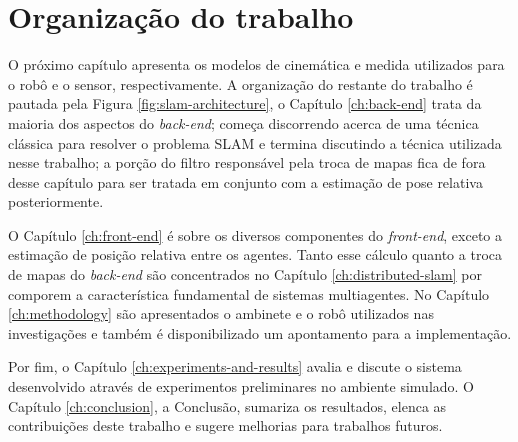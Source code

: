 \section{Organização do trabalho}
O próximo capítulo apresenta os 
modelos de cinemática e medida utilizados para o robô e o sensor, respectivamente. A organização do restante do 
trabalho é pautada pela Figura \ref{fig:slam-architecture}, o Capítulo 
\ref{ch:back-end} trata da maioria dos aspectos do \textit{back-end}; começa discorrendo acerca de uma técnica clássica para resolver o problema SLAM e termina discutindo a técnica utilizada nesse trabalho; a porção do filtro responsável pela troca de mapas fica de fora desse capítulo para ser 
tratada em conjunto com a estimação de pose relativa posteriormente.

O Capítulo \ref{ch:front-end} é sobre os diversos componentes do \textit{front-end}, exceto 
a estimação de posição relativa entre os agentes. Tanto esse cálculo 
quanto a troca de mapas do \textit{back-end} são concentrados no 
Capítulo \ref{ch:distributed-slam} por comporem a característica fundamental de 
sistemas multiagentes. No Capítulo \ref{ch:methodology} são apresentados 
o ambinete e o robô utilizados nas investigações e também é 
disponibilizado um apontamento para a implementação.

Por fim, o Capítulo \ref{ch:experiments-and-results} avalia e discute o sistema desenvolvido através de 
experimentos preliminares no ambiente simulado. O Capítulo \ref{ch:conclusion}, a Conclusão, sumariza 
os resultados, elenca as contribuições deste trabalho e sugere melhorias para trabalhos futuros.